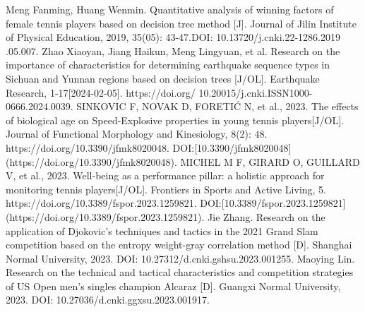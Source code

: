 \newpage

\begin{thebibliography}{99}  
Meng Fanming, Huang Wenmin. Quantitative analysis of winning factors of female tennis players based on decision tree method [J]. Journal of Jilin Institute of Physical Education, 2019, 35(05): 43-47.DOI: 10.13720/j.cnki.22-1286.2019 .05.007.
Zhao Xiaoyan, Jiang Haikun, Meng Lingyuan, et al. Research on the importance of characteristics for determining earthquake sequence types in Sichuan and Yunnan regions based on decision trees [J/OL]. Earthquake Research, 1-17[2024-02-05]. https://doi.org/ 10.20015/j.cnki.ISSN1000-0666.2024.0039.
SINKOVIC F, NOVAK D, FORETIĆ N, et al., 2023. The effects of biological age on Speed-Explosive properties in young tennis players[J/OL]. Journal of Functional Morphology and Kinesiology, 8(2): 48. https://doi.org/10.3390/jfmk8020048. DOI:[10.3390/jfmk8020048](https://doi.org/10.3390/jfmk8020048).
MICHEL M F, GIRARD O, GUILLARD V, et al., 2023. Well-being as a performance pillar: a holistic approach for monitoring tennis players[J/OL]. Frontiers in Sports and Active Living, 5. https://doi.org/10.3389/fspor.2023.1259821. DOI:[10.3389/fspor.2023.1259821](https://doi.org/10.3389/fspor.2023.1259821).
Jie Zhang. Research on the application of Djokovic's techniques and tactics in the 2021 Grand Slam competition based on the entropy weight-gray correlation method [D]. Shanghai Normal University, 2023. DOI: 10.27312/d.cnki.gshsu.2023.001255.
Maoying Lin. Research on the technical and tactical characteristics and competition strategies of US Open men's singles champion Alcaraz [D]. Guangxi Normal University, 2023. DOI: 10.27036/d.cnki.ggxsu.2023.001917.

\end{thebibliography}

